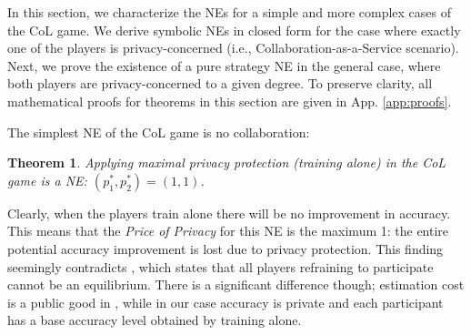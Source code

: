 \documentclass[USenglish,oneside,twocolumn]{article}
\theoremstyle{plain}
\newtheorem{theorem}{Theorem}
\newtheorem*{remark}{Remark}
\begin{document}
    
    
    In this section, we characterize the NEs for a simple and more complex cases of the CoL game. We derive symbolic NEs in closed form for the case where exactly one of the players is privacy-concerned (i.e., Collaboration-as-a-Service scenario). Next, we prove the existence of a pure strategy NE in the general case, where both players are privacy-concerned to a given degree. %
    To preserve clarity, all mathematical proofs for theorems in this section are given in App. \ref{app:proofs}.
    
    The simplest NE of the CoL game is no collaboration:
    
    \vspace{-0.25cm}
    \begin{theorem}
        \label{th:tri}
        Applying maximal privacy protection (training alone) in the CoL game is a NE: $(p^*_1,p^*_2)=(1,1)$.
    \end{theorem}
    \vspace{-0.25cm}
    
    Clearly, when the players train alone there will be no improvement in accuracy. This means that the \textit{Price of Privacy} for this NE is the maximum 1: the entire potential accuracy improvement is lost due to privacy protection. This finding seemingly contradicts  \cite{chessa2015game}, which states that all players refraining to participate cannot be an equilibrium. There is a significant difference though; estimation cost is a public good in \cite{chessa2015game}, while in our case accuracy is private and each participant has a base accuracy level obtained by training alone.
    
    \vspace{-0.5cm}
\end{document}
